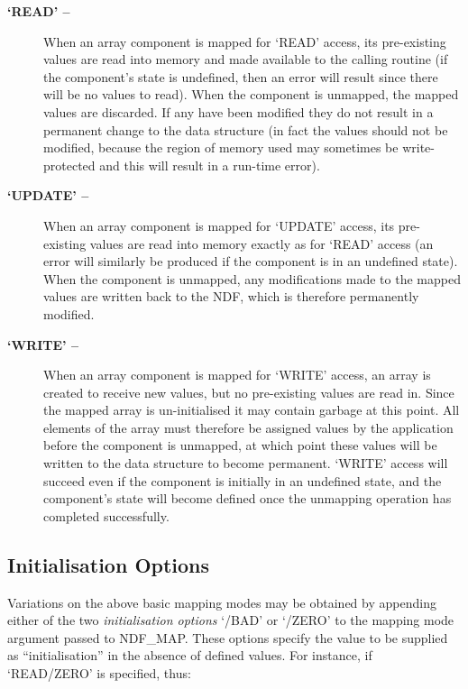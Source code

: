 \documentclass[twoside,11pt]{article}
\newcommand{\htmlref}[2]{#1}
\newcommand{\xlabel}[1]{}
\newcommand{\st}[1]{{\em{#1}}}
\begin{document}
\begin{description}

\item[{\bf `READ' --}] When an array component is mapped for `READ'
access, its pre-existing values are read into memory and made available to
the calling routine (if the component's state is undefined, then an error
will result since there will be no values to read). 
When the component is unmapped, the mapped values are discarded.
If any have been modified they do not result in a permanent change to the
data structure (in fact the values should not be modified, because the
region of memory used may sometimes be write-protected and this will result
in a run-time error). 

\item[{\bf `UPDATE' --}] When an array component is mapped for `UPDATE' access,
its pre-existing values are read into memory exactly as for `READ' access (an
error will similarly be produced if the component is in an undefined state). 
When the component is unmapped, any modifications made to the mapped values
are written back to the NDF, which is therefore permanently modified. 

\item[{\bf `WRITE' --}] When an array component is mapped for `WRITE'
access, an array is created to receive new values, but no pre-existing
values are read in. 
Since the mapped array is un-initialised it may contain garbage at this
point. 
All elements of the array must therefore be assigned values by the
application before the component is unmapped, at which point these values
will be written to the data structure to become permanent. 
`WRITE' access will succeed even if the component is initially in an
undefined state, and the component's state will become defined once the
unmapping operation has completed successfully. 

\end{description}

\subsection{\xlabel{initialisation_options}\label{ss:initialisationoptions}Initialisation Options}

Variations on the above basic mapping modes may be obtained by appending
either of the two \st{initialisation options\/} `/BAD' or `/ZERO' to the
mapping mode argument passed to \htmlref{NDF\_MAP}{NDF_MAP}. 
These options specify the value to be supplied as ``initialisation'' in the
absence of defined values. 
For instance, if `READ/ZERO' is specified, thus:
\end{document}

